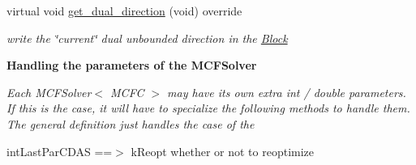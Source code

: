 \begin{Indent}
\begin{DoxyCompactItemize}
virtual void \mbox{\hyperlink{class_s_m_spp__di__unipi__it_1_1_m_c_f_solver_a20bea98e93ae37db17f0a0424be71987}{get\+\_\+dual\+\_\+direction}} (void) override
\begin{DoxyCompactList}\small\item\em write the \char`\"{}current\char`\"{} dual unbounded direction in the \mbox{\hyperlink{class_s_m_spp__di__unipi__it_1_1_block}{Block}} \end{DoxyCompactList}\end{DoxyCompactItemize}
\end{Indent}
\begin{Indent}\textbf{ Handling the parameters of the M\+C\+F\+Solver}\par
{\em Each M\+C\+F\+Solver$<$ M\+C\+F\+C $>$ may have its own extra int / double parameters. If this is the case, it will have to specialize the following methods to handle them. The general definition just handles the case of the

int\+Last\+Par\+C\+D\+AS ==$>$ k\+Reopt whether or not to reoptimize

}
\end{Indent}
